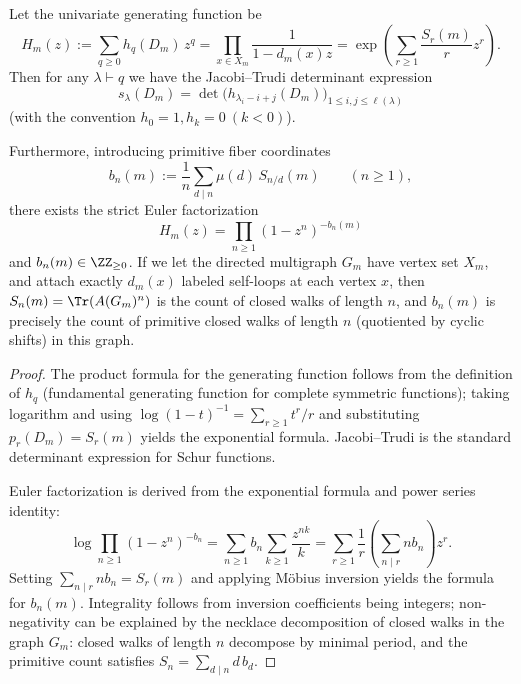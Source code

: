 \begin{proposition}\label{prop:pom-schur-trace-jacobi-trudi-euler-primitive-fiber}
Let the univariate generating function be
\[
H_m(z):=\sum_{q\ge 0}h_q(D_m)\,z^q
=\prod_{x\in X_m}\frac{1}{1-d_m(x)z}
=\exp\!\left(\sum_{r\ge 1}\frac{S_r(m)}{r}z^r\right).
\]
Then for any \(\lambda\vdash q\) we have the Jacobi--Trudi determinant expression
\[
\boxed{\;
s_\lambda(D_m)=\det\bigl(h_{\lambda_i-i+j}(D_m)\bigr)_{1\le i,j\le \ell(\lambda)}\;}
\]
(with the convention \(h_0=1,h_k=0\ (k<0)\)).
\par
Furthermore, introducing primitive fiber coordinates
\[
b_n(m):=\frac{1}{n}\sum_{d\mid n}\mu(d)\,S_{n/d}(m)\qquad(n\ge 1),
\]
there exists the strict Euler factorization
\[
\boxed{\;
H_m(z)=\prod_{n\ge 1}(1-z^n)^{-b_n(m)}\;}
\]
and \(b_n(m)\in\ZZ_{\ge 0}\).
If we let the directed multigraph \(G_m\) have vertex set \(X_m\), and attach exactly \(d_m(x)\) labeled self-loops at each vertex \(x\),
then \(S_n(m)=\Tr(A(G_m)^n)\) is the count of closed walks of length \(n\), and \(b_n(m)\) is precisely the count of primitive closed walks of length \(n\) (quotiented by cyclic shifts) in this graph.
\end{proposition}
\begin{proof}
The product formula for the generating function follows from the definition of \(h_q\) (fundamental generating function for complete symmetric functions);
taking logarithm and using
\(
\log(1-t)^{-1}=\sum_{r\ge 1}t^r/r
\)
and substituting \(p_r(D_m)=S_r(m)\) yields the exponential formula.
Jacobi--Trudi is the standard determinant expression for Schur functions.
\par
Euler factorization is derived from the exponential formula and power series identity:
\[
\log\prod_{n\ge 1}(1-z^n)^{-b_n}
=\sum_{n\ge 1}b_n\sum_{k\ge 1}\frac{z^{nk}}{k}
=\sum_{r\ge 1}\frac{1}{r}\left(\sum_{n\mid r}n b_n\right)z^r.
\]
Setting \(\sum_{n\mid r}n b_n=S_r(m)\) and applying Möbius inversion yields the formula for \(b_n(m)\).
Integrality follows from inversion coefficients being integers; non-negativity can be explained by the necklace decomposition of closed walks in the graph \(G_m\): closed walks of length \(n\) decompose by minimal period, and the primitive count satisfies \(S_n=\sum_{d\mid n} d\,b_d\).
\end{proof}

